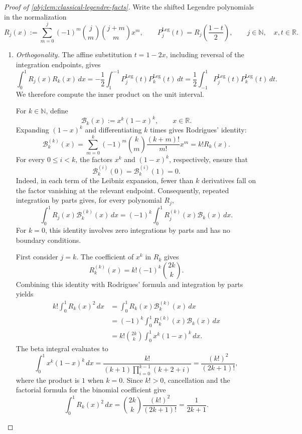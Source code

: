 \begin{proof}[Proof of \cref{obj:lem:classical-legendre-facts}]
Write the shifted Legendre polynomials in the normalization
\[
R_j(x):=\sum_{m=0}^{j}(-1)^m
  \binom{j}{m}\binom{j+m}{m}x^m,
\qquad
P_j^{\mathrm{Leg}}(t)=R_j\!\left(\frac{1-t}{2}\right),
\qquad j\in\mathbb N,\quad x,t\in\mathbb R.
\]

\begin{enumerate}
\item \emph{Orthogonality.}
The affine substitution \(t=1-2x\), including reversal of the integration endpoints, gives
\[
\int_0^1R_j(x)R_k(x)\,dx
=-\frac12\int_1^{-1}
  P_j^{\mathrm{Leg}}(t)P_k^{\mathrm{Leg}}(t)\,dt
=\frac12\int_{-1}^1
  P_j^{\mathrm{Leg}}(t)P_k^{\mathrm{Leg}}(t)\,dt.
\]
We therefore compute the inner product on the unit interval.

For \(k\in\mathbb N\), define
\[
\mathcal B_k(x):=x^k(1-x)^k,
\qquad x\in\mathbb R.
\]
Expanding \((1-x)^k\) and differentiating \(k\) times gives Rodrigues' identity:
\[
\mathcal B_k^{(k)}(x)
=\sum_{m=0}^k(-1)^m\binom{k}{m}
  \frac{(k+m)!}{m!}x^m
=k!R_k(x).
\]
For every \(0\le i<k\), the factors \(x^k\) and \((1-x)^k\), respectively, ensure that
\[
\mathcal B_k^{(i)}(0)=\mathcal B_k^{(i)}(1)=0.
\]
Indeed, in each term of the Leibniz expansion, fewer than \(k\) derivatives fall on the factor vanishing at the relevant endpoint. Consequently, repeated integration by parts gives, for every polynomial \(R_j\),
\[
\int_0^1R_j(x)\mathcal B_k^{(k)}(x)\,dx
=(-1)^k\int_0^1R_j^{(k)}(x)\mathcal B_k(x)\,dx.
\]
For \(k=0\), this identity involves zero integrations by parts and has no boundary conditions.

First consider \(j=k\). The coefficient of \(x^k\) in \(R_k\) gives
\[
R_k^{(k)}(x)=k!(-1)^k\binom{2k}{k}.
\]
Combining this identity with Rodrigues' formula and integration by parts yields
\[
\begin{aligned}
k!\int_0^1R_k(x)^2\,dx
&=\int_0^1R_k(x)\mathcal B_k^{(k)}(x)\,dx\\
&=(-1)^k\int_0^1R_k^{(k)}(x)\mathcal B_k(x)\,dx\\
&=k!\binom{2k}{k}\int_0^1x^k(1-x)^k\,dx.
\end{aligned}
\]
The beta integral evaluates to
\[
\int_0^1x^k(1-x)^k\,dx
=\frac{k!}{(k+1)\prod_{i=0}^{k-1}(k+2+i)}
=\frac{(k!)^2}{(2k+1)!},
\]
where the product is \(1\) when \(k=0\). Since \(k!>0\), cancellation and the factorial formula for the binomial coefficient give
\[
\int_0^1R_k(x)^2\,dx
=\binom{2k}{k}\frac{(k!)^2}{(2k+1)!}
=\frac{1}{2k+1}.
\]


\end{enumerate}
\end{proof}
